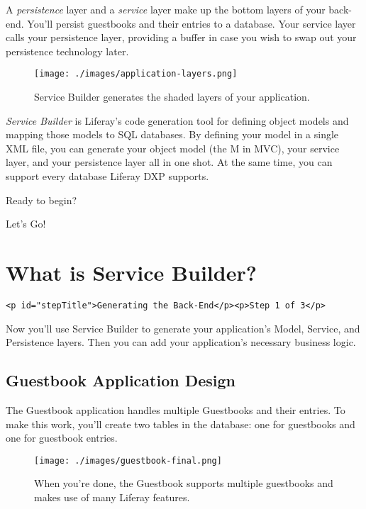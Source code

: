 A \emph{persistence} layer and a \emph{service} layer make up the bottom
layers of your back-end. You'll persist guestbooks and their entries to
a database. Your service layer calls your persistence layer, providing a
buffer in case you wish to swap out your persistence technology later.

\begin{figure}
\centering
\texttt{[image: ./images/application-layers.png]}
\caption{Service Builder generates the shaded layers of your
application.}
\end{figure}

\emph{Service Builder} is Liferay's code generation tool for defining
object models and mapping those models to SQL databases. By defining
your model in a single XML file, you can generate your object model (the
M in MVC), your service layer, and your persistence layer all in one
shot. At the same time, you can support every database Liferay DXP
supports.

Ready to begin?

Let's Go!{}

\chapter{What is Service Builder?}\label{what-is-service-builder}

\begin{verbatim}
<p id="stepTitle">Generating the Back-End</p><p>Step 1 of 3</p>
\end{verbatim}

Now you'll use Service Builder to generate your application's Model,
Service, and Persistence layers. Then you can add your application's
necessary business logic.

\section{Guestbook Application
Design}\label{guestbook-application-design}

The Guestbook application handles multiple Guestbooks and their entries.
To make this work, you'll create two tables in the database: one for
guestbooks and one for guestbook entries.

\begin{figure}
\centering
\texttt{[image: ./images/guestbook-final.png]}
\caption{When you're done, the Guestbook supports multiple guestbooks
and makes use of many Liferay features.}
\end{figure}

